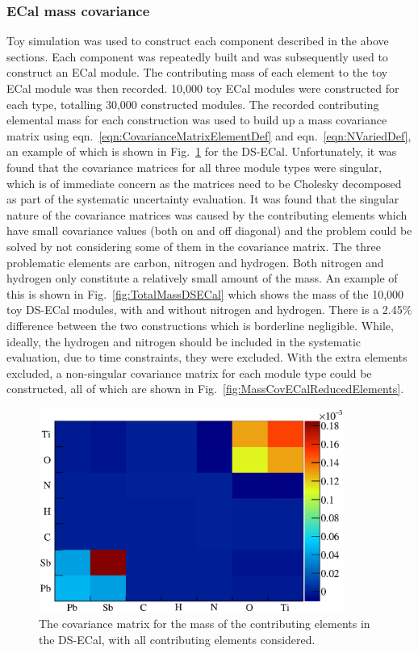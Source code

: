 \subsubsection{ECal mass covariance}
\label{subsubsec:ECalMassCovariance}
Toy simulation was used to construct each component described in the above sections.  Each component was repeatedly built and was subsequently used to construct an ECal module.  The contributing mass of each element to the toy ECal module was then recorded.  10,000 toy ECal modules were constructed for each type, totalling 30,000 constructed modules.  The recorded contributing elemental mass for each construction was used to build up a mass covariance matrix using eqn.~\ref{eqn:CovarianceMatrixElementDef} and eqn.~\ref{eqn:NVariedDef}, an example of which is shown in Fig.~\ref{fig:MassCovDSECalAllElements} for the DS-ECal.  Unfortunately, it was found that the covariance matrices for all three module types were singular, which is of immediate concern as the matrices need to be Cholesky decomposed as part of the systematic uncertainty evaluation.  It was found that the singular nature of the covariance matrices was caused by the contributing elements which have small covariance values (both on and off diagonal) and the problem could be solved by not considering some of them in the covariance matrix.  The three problematic elements are carbon, nitrogen and hydrogen.  Both nitrogen and hydrogen only constitute a relatively small amount of the mass.  An example of this is shown in Fig.~\ref{fig:TotalMassDSECal} which shows the mass of the 10,000 toy DS-ECal modules, with and without nitrogen and hydrogen.  There is a 2.45$\%$ difference between the two constructions which is borderline negligible.  While, ideally, the hydrogen and nitrogen should be included in the systematic evaluation, due to time constraints, they were excluded.  With the extra elements excluded, a non-singular covariance matrix for each module type could be constructed, all of which are shown in Fig.~\ref{fig:MassCovECalReducedElements}.
\begin{figure}
  \centering
  \includegraphics[width=10cm]{images/measurement/systematics/detector/mass/MassCov_DSECal_AllElements.eps}
  \caption{The covariance matrix for the mass of the contributing elements in the DS-ECal, with all contributing elements considered.}
  \label{fig:MassCovDSECalAllElements}
\end{figure}
